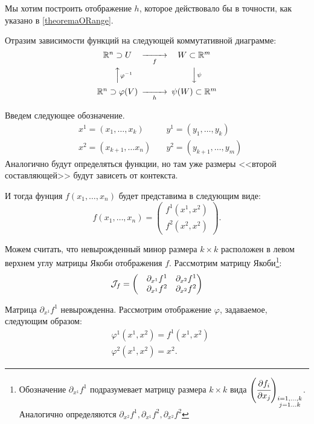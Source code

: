 	\begin{Proof}
		Мы хотим построить отображение $h$, которое действовало бы в точности, как указано в \ref{theoremaORange}.
		
		Отразим зависимости функций на следующей коммутативной диаграмме:
		$$
		\begin{CD}
			\mbb R^n \supset U @>>{f}> W \subset \mbb R^m\\
			@AA{\varphi^{-1}}A @VV{\psi}V\\
			\mbb R^n \supset \varphi(V) @>>{h}> \mbb \psi(W) \subset \mbb R^m
		\end{CD}
		$$
		
		Введем следующее обозначение. 
		\begin{align*}
			&x^1 = (x_1, \dots, x_k)   	\quad  &y^1 = (y_1, \dots, y_k)\\
			&x^2 = (x_{k+1}, \dots x_n) \quad  &y^2 = (y_{k+1}, \dots, y_m)
		\end{align*}
		Аналогично будут определяться функции, но там уже размеры <<второй составляющей>> будут зависеть от контекста.
		
		И тогда фунция $f(x_1, \dots, x_n)$ будет представима в следующим виде:
		$$
			f(x_1, \dots, x_n) = \begin{pmatrix}
				f^1(x^1, x^2)\\
				f^2(x^2, x^2)
			\end{pmatrix}.
		$$
		
		Можем считать, что невырожденный минор размера $k\times k$ расположен в левом верхнем углу матрицы Якоби отображения $f$. Рассмотрим матрицу Якоби\footnote{Обозначение $\partial_{x^1} f^1$ подразумевает матрицу размера $k\times k$ вида $\left(\cfrac {\partial f_i} {\partial x_j}\right)_{\substack{i = 1, \dots, k\\ j = 1\dots k}}$. Аналогично определяются $\partial_{x^2} f^1, \partial_{x^1} f^2, \partial_{x^2} f^2$}:
		$$
			\mathcal{J}_f = \begin{pmatrix}
				&\partial_{x^1} f^1 &\partial_{x^2} f^1\\
				&\partial_{x^1} f^2 &\partial_{x^2} f^2
			\end{pmatrix}
		$$
		
		Матрица $\partial_{x^1} f^1$ невырожденна. Рассмотрим отображение $\varphi$, задаваемое, следующим образом:
		\begin{align*}
			&\varphi^1(x^1, x^2) = f^1(x^1, x^2)\\
			&\varphi^2(x^1, x^2) = x^2.
		\end{align*}
		

\end{Proof}
